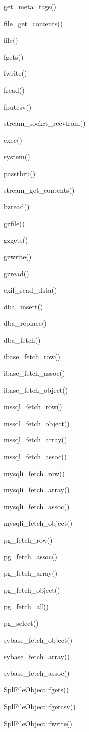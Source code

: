 \begin{compactitem}
\item get\_meta\_tags()
\item file\_get\_contents()
\item file()
\item fgets()
\item fwrite()
\item fread()
\item fputcsv()
\item stream\_socket\_recvfrom()
\item exec()
\item system()
\item passthru()
\item stream\_get\_contents()
\item bzread()
\item gzfile()
\item gzgets()
\item gzwrite()
\item gzread()
\item exif\_read\_data()
\item dba\_insert()
\item dba\_replace()
\item dba\_fetch()
\item ibase\_fetch\_row()
\item ibase\_fetch\_assoc()
\item ibase\_fetch\_object()
\item mssql\_fetch\_row()
\item mssql\_fetch\_object()
\item mssql\_fetch\_array()
\item mssql\_fetch\_assoc()
\item mysqli\_fetch\_row()
\item mysqli\_fetch\_array()
\item mysqli\_fetch\_assoc()
\item mysqli\_fetch\_object()
\item pg\_fetch\_row()
\item pg\_fetch\_assoc()
\item pg\_fetch\_array()
\item pg\_fetch\_object()
\item pg\_fetch\_all()
\item pg\_select()
\item sybase\_fetch\_object()
\item sybase\_fetch\_array()
\item sybase\_fetch\_assoc()
\item SplFileObject::fgets()
\item SplFileObject::fgetcsv()
\item SplFileObject::fwrite()
\end{compactitem}



